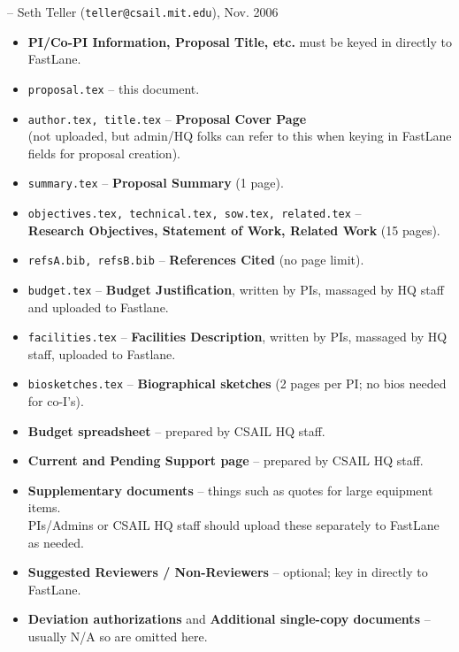 {\hfill {\small -- Seth Teller (\verb+teller@csail.mit.edu+), Nov. 2006}}
%
\begin{itemize}

\item {\bf PI/Co-PI Information, Proposal Title, etc.} must be keyed in
directly to FastLane.

\item \verb+proposal.tex+ -- this document.

\item \verb+author.tex, title.tex+ -- {\bf Proposal Cover Page}\\
      (not uploaded, but admin/HQ folks can refer to this 
       when keying in FastLane fields for proposal creation).

\item \verb+summary.tex+ -- {\bf Proposal Summary} (1 page).

\item \verb+objectives.tex, technical.tex, sow.tex, related.tex+ -- \\
      {\bf Research Objectives, Statement of Work, Related Work} (15 pages).

\item \verb+refsA.bib, refsB.bib+ -- {\bf References Cited} (no page limit).

\item \verb+budget.tex+ -- {\bf Budget Justification}, written by PIs,
      massaged by HQ staff and uploaded to Fastlane.

\item \verb+facilities.tex+ -- {\bf Facilities Description}, written by PIs,
      massaged by HQ staff, uploaded to Fastlane.

\item \verb+biosketches.tex+ -- {\bf Biographical sketches} 
      (2 pages per PI; no bios needed for co-I's).

\item {\bf Budget spreadsheet} -- prepared by CSAIL HQ staff.

\item {\bf Current and Pending Support page} -- prepared by CSAIL HQ staff.

\item {\bf Supplementary documents} -- things such as quotes for
  large equipment items.\\ PIs/Admins or CSAIL HQ staff should upload these separately 
  to FastLane as needed.

\item {\bf Suggested Reviewers / Non-Reviewers} -- optional; key in directly to FastLane.

\item {\bf Deviation authorizations} and {\bf Additional
  single-copy documents} -- usually N/A so are omitted here.

\end{itemize}
